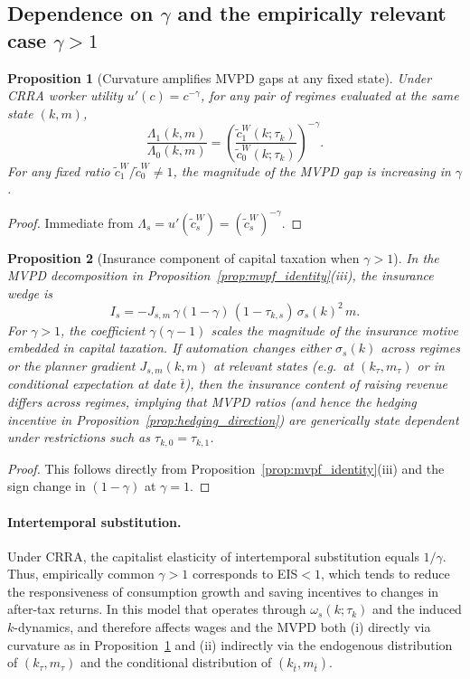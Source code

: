 \documentclass{article}
\newtheorem{proposition}{Proposition}
\begin{document}
\subsection{Dependence on $\gamma$ and the empirically relevant case $\gamma>1$}
\label{sec:mvpf_gamma}

\begin{proposition}[Curvature amplifies MVPD gaps at any fixed state]
\label{prop:curvature_amplifies}
Under CRRA worker utility $u'(c)=c^{-\gamma}$, for any pair of regimes evaluated at the same state $(k,m)$,
\begin{equation}
\label{eq:mvpf_ratio_curvature}
\frac{\Lambda_1(k,m)}{\Lambda_0(k,m)}
=
\left(\frac{\widetilde c^W_1(k;\tau_k)}{\widetilde c^W_0(k;\tau_k)}\right)^{-\gamma}.
\end{equation}
For any fixed ratio $\widetilde c^W_1/\widetilde c^W_0\neq 1$, the magnitude of the MVPD gap is increasing in $\gamma$.
\end{proposition}

\begin{proof}
Immediate from $\Lambda_s=u'(\widetilde c^W_s)=(\widetilde c^W_s)^{-\gamma}$.
\end{proof}

\begin{proposition}[Insurance component of capital taxation when $\gamma>1$]
\label{prop:insurance_component}
In the MVPD decomposition in Proposition~\ref{prop:mvpf_identity}(iii), the insurance wedge is
\[
I_s=-J_{s,m}\,\gamma(1-\gamma)\,(1-\tau_{k,s})\,\sigma_s(k)^2\,m.
\]
For $\gamma>1$, the coefficient $\gamma(\gamma-1)$ scales the magnitude of the insurance motive embedded in capital taxation. If automation changes either $\sigma_s(k)$ across regimes or the planner gradient $J_{s,m}(k,m)$ at relevant states (e.g.\ at $(k_\tau,m_\tau)$ or in conditional expectation at date $\bar t$), then the insurance content of raising revenue differs across regimes, implying that MVPD ratios (and hence the hedging incentive in Proposition~\ref{prop:hedging_direction}) are generically state dependent under restrictions such as $\tau_{k,0}=\tau_{k,1}$.
\end{proposition}

\begin{proof}
This follows directly from Proposition~\ref{prop:mvpf_identity}(iii) and the sign change in $(1-\gamma)$ at $\gamma=1$.
\end{proof}

\paragraph{Intertemporal substitution.}
Under CRRA, the capitalist elasticity of intertemporal substitution equals $1/\gamma$. Thus, empirically common $\gamma>1$ corresponds to EIS$<1$, which tends to reduce the responsiveness of consumption growth and saving incentives to changes in after-tax returns. In this model that operates through $\omega_s(k;\tau_k)$ and the induced $k$-dynamics, and therefore affects wages and the MVPD both (i) directly via curvature as in Proposition~\ref{prop:curvature_amplifies} and (ii) indirectly via the endogenous distribution of $(k_\tau,m_\tau)$ and the conditional distribution of $(k_{\bar t},m_{\bar t})$.
\end{document}
